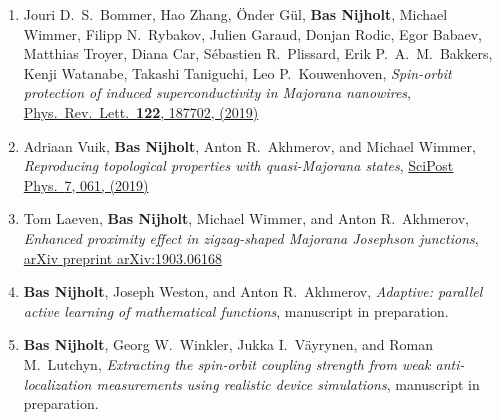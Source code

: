\begin{enumerate}
\item Jouri D.~S.~Bommer, Hao Zhang, {\"O}nder G{\"u}l, \textbf{Bas Nijholt}, Michael Wimmer, Filipp N.~Rybakov, Julien Garaud, Donjan Rodic, Egor Babaev, Matthias Troyer, Diana Car, S{\'e}bastien R.~Plissard, Erik P.~A.~M.~Bakkers, Kenji Watanabe, Takashi Taniguchi, Leo P.~Kouwenhoven, \textit{Spin-orbit protection of induced superconductivity in Majorana nanowires}, \href{https://doi.org/10.1103/PhysRevLett.122.187702}{Phys.~Rev.~Lett.~\textbf{122}, 187702, (2019)}

\item Adriaan Vuik, \textbf{Bas Nijholt}, Anton R.~Akhmerov, and Michael Wimmer, \textit{Reproducing topological properties with quasi-Majorana states}, \href{https://doi.org/10.21468/SciPostPhys.7.5.061}{SciPost Phys.~\textrm{7}, 061, (2019)}

\item Tom Laeven, \textbf{Bas Nijholt}, Michael Wimmer, and Anton R.~Akhmerov, \textit{Enhanced proximity effect in zigzag-shaped Majorana Josephson junctions}, \href{https://arxiv.org/abs/1903.06168}{arXiv preprint arXiv:1903.06168}

\item \textbf{Bas Nijholt}, Joseph Weston, and Anton R.~Akhmerov, \textit{Adaptive: parallel active learning of mathematical functions}, manuscript in preparation.

\item \textbf{Bas Nijholt}, Georg W.~Winkler, Jukka I.~V{\"a}yrynen, and Roman M.~Lutchyn, \textit{Extracting the spin-orbit coupling strength from weak anti-localization measurements using realistic device simulations}, manuscript in preparation.

\end{enumerate}

